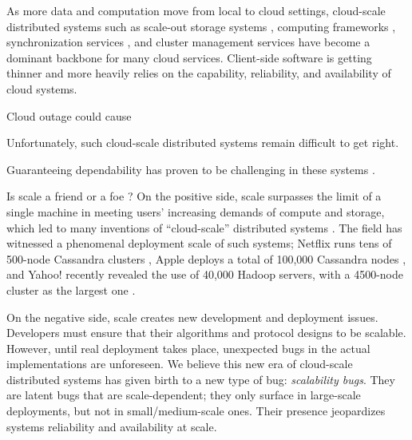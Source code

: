 As more data and computation move from local to cloud settings, cloud-scale
distributed systems such as scale-out storage systems \cite{Chang+06-BigTable,
DeCandia+07-Dynamo, Ghemawat+03-GoogleFS, Nightingale+12-FlatFDS}, computing
frameworks \cite{DeanGhemawat04-MapReduce, Murray+13-NaiadTimelyDataflow},
synchronization services \cite{Burrows06-Chubby, Hunt+10-ZooKeeperPaper}, and
cluster management services \cite{Hindman+11-Mesos, Kumar+13-Yarn} have become
a dominant backbone for many cloud services. Client-side software is getting
thinner and more heavily relies on the capability, reliability, and
availability of cloud systems. 

Cloud outage could cause

Unfortunately, such cloud-scale distributed systems remain difficult to get
right. 


Guaranteeing dependability has proven to be challenging in these systems
\cite{Gunawi+11-FateDestini, Guo+11-Demeter, Yang+09-Modist, Wang+14-Exalt}.

Is scale a friend or a foe \cite{Ousterhout+11-ScaleFriendEnemy}?
On the positive side, scale surpasses the limit of a single machine in
meeting users' increasing demands of compute and storage, which led to
many inventions of ``cloud-scale'' distributed systems
\cite{Chang+06-BigTable, 
DeanGhemawat04-MapReduce, 
DeCandia+07-Dynamo,
Ghemawat+03-GoogleFS, 
Hindman+11-Mesos,
Verma+15-Borg}.  The field has witnessed a
phenomenal deployment scale of such systems;
Netflix runs tens of 500-node Cassandra clusters \cite{RunningNetflix13},
Apple deploys a total of 100,000 Cassandra nodes \cite{WikiCassandra}, 
and Yahoo! recently revealed the use of 40,000 Hadoop servers,
with a 4500-node cluster as the largest one \cite{LargestHadoop}.

On the negative side, scale creates new development and deployment issues.
Developers must ensure that their algorithms and protocol designs
to be scalable.
However, until real deployment takes place, unexpected bugs 
in the actual implementations are unforeseen.
We believe this new era of cloud-scale distributed systems has given birth
to a new type of bug: {\em scalability bugs}.  They are latent bugs that
are scale-dependent; they only surface in large-scale deployments, but not 
in small/medium-scale ones.  Their presence jeopardizes systems
reliability and availability at scale.
\fi
